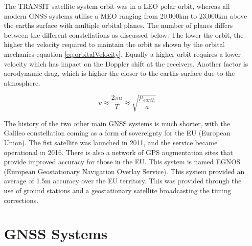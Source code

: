 The TRANSIT satellite system orbit was in a LEO polar orbit, whereas all modern GNSS systems utilise a MEO ranging from 20,000km to
23,000km above the earths surface with multiple orbital planes. The number of planes differs between the different constellations as discussed below. The lower the orbit,
the higher the velocity required to maintain the orbit as shown by the orbital mechanics equation \ref{eq:orbitalVelocity}. Equally a higher orbit requires a lower
velocity which has impact on the Doppler shift at the receivers. Another factor is aerodynamic drag, which is higher the closer to the earths surface due to the
atmosphere.

\begin{equation} \label{eq:orbitalVelocity}
    v \approx \frac{2\pi a}{T} \approx \sqrt{\frac{\mu_{earth}}{a}}
\end{equation} 

The history of the two other main GNSS systems is much shorter, with the Galileo constellation coming as a form of sovereignty for the EU (European Union). The fist satellite
was launched in 2011, and the service became operational in 2016. There is also a network of GPS augmentation sites that provide improved accuracy for those in the EU.
This system is named EGNOS (European Geostationary Navigation Overlay Service). This system provided an average of 1.5m accuracy over the EU territory. This was provided through the use of ground stations and a
geostationary satellite broadcasting the timing corrections. 


\section{GNSS Systems} \label{sec:GNSS}
